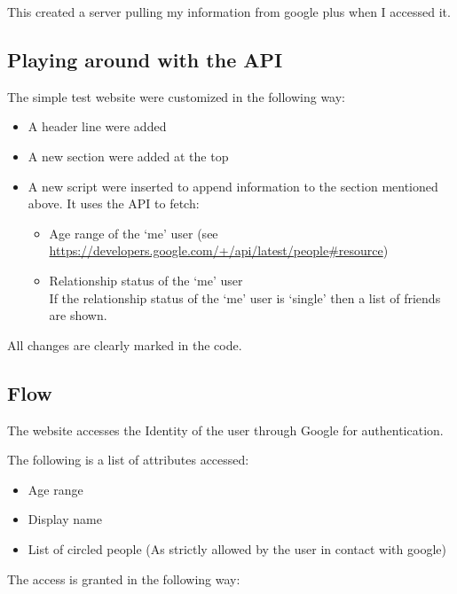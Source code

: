 \documentclass[12pt, a4paper]{article}
\begin{document}
This created a server pulling my information from google plus when I
accessed it.

\subsection*{Playing around with the API}

The simple test website were customized in the following way:
\begin{itemize}
\item A header line were added
\item A new section were added at the top
\item A new script were inserted to append information to the section
  mentioned above. It uses the API to fetch:
  \begin{itemize}
  \item Age range of the ‘me’ user (see
    \url{https://developers.google.com/+/api/latest/people#resource})
  \item Relationship status of the ‘me’ user \\
    If the relationship status of the ‘me’ user is ‘single’ then a list of
    friends are shown.
  \end{itemize}
\end{itemize}

All changes are clearly marked in the code.

\subsection*{Flow}

The website accesses the Identity of the user through Google for
authentication.

The following is a list of attributes accessed:
\begin{itemize}
  \item Age range
  \item Display name
  \item List of circled people (As strictly allowed by the user in
    contact with google)
\end{itemize}

The access is granted in the following way:
\end{document}

